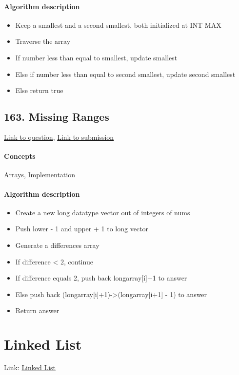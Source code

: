 \documentclass[11pt]{book}
\begin{document}
\paragraph{Algorithm description}
\begin{itemize}
    \item Keep a smallest and a second smallest, both initialized at INT MAX
    \item Traverse the array
    \item If number less than equal to smallest, update smallest
    \item Else if number less than equal to second smallest, update second smallest
    \item Else return true
\end{itemize}

\subsection{163. Missing Ranges}
\href{https://leetcode.com/problems/missing-ranges/}{Link to question},
\href{https://leetcode.com/submissions/detail/337760992/}{Link to submission}
\paragraph{Concepts}
Arrays, Implementation
\paragraph{Algorithm description}
\begin{itemize}
    \item Create a new long datatype vector out of integers of nums
    \item Push lower - 1 and upper + 1 to long vector
    \item Generate a differences array 
    \item If difference < 2, continue
    \item If difference equals 2, push back longarray[i]+1 to answer
    \item Else push back (longarray[i]+1)->(longarray[i+1] - 1) to answer
    \item Return answer
\end{itemize}

\section{Linked List}
Link: \href{https://leetcode.com/explore/interview/card/top-interview-questions-medium/107/linked-list/}{Linked List}
\end{document}

